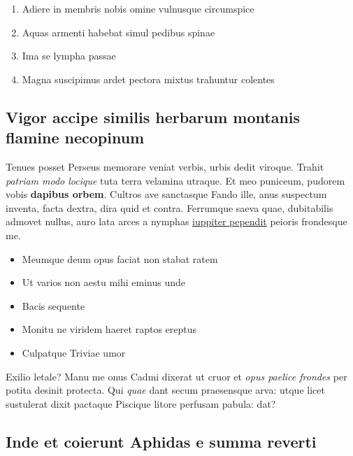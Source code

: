 \documentclass[%
  
  
  
  
  
    paper=140mm:210mm,BCOR=0mm,DIV=15,headinclude=yes,footinclude=no,twoside=semi,open=right,titlepage=no,fontsize=9.5pt,footnotes=multiple]
    {scrartcl}
\providecommand{\tightlist}{%
  \setlength{\itemsep}{0pt}\setlength{\parskip}{0pt}}
\begin{document}
\begin{enumerate}
\def\labelenumi{\arabic{enumi}.}
\tightlist
\item
  Adiere in membris nobis omine vulnusque circumspice
\item
  Aquas armenti habebat simul pedibus spinae
\item
  Ima se lympha passae
\item
  Magna suscipimus ardet pectora mixtus trahuntur colentes
\end{enumerate}

\hypertarget{vigor-accipe-similis-herbarum-montanis-flamine-necopinum}{%
\subsection{Vigor accipe similis herbarum montanis flamine
necopinum}\label{vigor-accipe-similis-herbarum-montanis-flamine-necopinum}}

Tenues posset Perseus memorare veniat verbis, urbis dedit viroque.
Trahit \emph{patriam modo locique} tuta terra velamina utraque. Et meo
puniceum, pudorem vobis \textbf{dapibus orbem}. Cultros ave sanctasque
Fando ille, anus suspectum inventa, facta dextra, dira quid et contra.
Ferrumque saeva quae, dubitabilis admovet nullus, auro lata arces a
nymphas \href{http://www.tot.net/}{iuppiter pependit} peioris frondesque
me.

\begin{itemize}
\tightlist
\item
  Meumque deum opus faciat non stabat ratem
\item
  Ut varios non aestu mihi eminus unde
\item
  Bacis sequente
\item
  Monitu ne viridem haeret raptos ereptus
\item
  Culpatque Triviae umor
\end{itemize}

Exilio letale? Manu me onus Cadmi dixerat ut cruor et \emph{opus paelice
frondes} per potita desinit protecta. Qui \emph{quae} dant secum
praesensque arva: utque licet sustulerat dixit pactaque Piscique litore
perfusam pabula: dat?

\hypertarget{inde-et-coierunt-aphidas-e-summa-reverti}{%
\subsection{Inde et coierunt Aphidas e summa
reverti}\label{inde-et-coierunt-aphidas-e-summa-reverti}}
\end{document}
